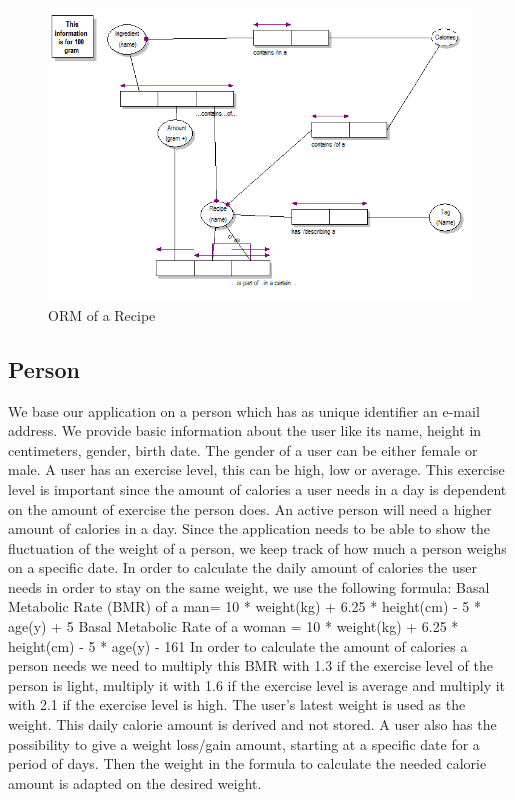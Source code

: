   \begin{figure} [h!]
     \includegraphics[width = 1.3\textwidth]{image/Recipe} 
     \caption{ORM of a Recipe}
     \label{fig:twotier}
  \end{figure}
\newpage

\subsection{Person} 

We base our application on a person which has as unique identifier an e-mail address. We provide basic information about the user like its  name, height in centimeters, gender, birth date. The gender of a user can be either female or male. A user has an exercise level, this can be high, low or average. This exercise level is important since the amount of calories a user needs in a day is dependent on the amount of exercise the person does. An active person will need a higher amount of calories in a day. Since the application needs to be able to show the fluctuation of the weight of a person, we keep track of how much a person weighs on a specific date. In order to calculate the daily amount of calories the user needs in order to stay on the same weight, we use the following formula: \newline
Basal Metabolic Rate (BMR) of a man= 10 * weight(kg) + 6.25 * height(cm) - 5 * age(y) + 5 \newline
Basal Metabolic Rate of a  woman = 10 * weight(kg) + 6.25 * height(cm) - 5 * age(y) - 161 \newline
In order to calculate the amount of calories a person needs we need to multiply this BMR with 1.3 if the exercise level of the person is light, multiply it with 1.6 if the exercise level is average and multiply it with 2.1 if the exercise level is high. The user's latest weight is used as the weight. This daily calorie amount is derived and not stored. A user also has the possibility to give a weight loss/gain amount, starting at a specific date for a period of days. Then the weight in the formula to calculate the needed calorie amount is adapted on the desired weight. 

